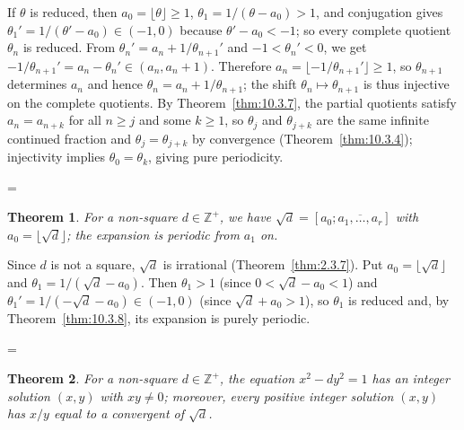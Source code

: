 \documentclass[11pt]{article}
\makeatletter
\theoremstyle{ntstyle}
\newtheorem{theorem}{Theorem}[subsection]
\let\nt@closedisplay\]
\def\nt@guardedclose{\@ifnextchar\par{\nt@closeafterpar}{\@ifnextchar\end{\postdisplaypenalty\@M\nt@closedisplay}{\nt@closedisplay}}}
\def\nt@closeafterpar\par{\@ifnextchar\par{\nt@closeafterpar}{\@ifnextchar\end{\postdisplaypenalty\@M\nt@closedisplay\par}{\nt@closedisplay\par}}}
\renewenvironment{proof}[1][\proofname]{\par
  \pushQED{\qed}\normalfont\topsep\medskipamount\edef\nt@afterproof{\@endparpenalty=\the\@endparpenalty\relax}\@beginparpenalty\@M\@endparpenalty\@M\let\]\nt@guardedclose\trivlist\item[]\textit{#1\@addpunct{.}} \ignorespaces}{\ifvmode\addpenalty\@M\fi\popQED\nt@afterproof\endtrivlist\@endpefalse}
\makeatother
\begin{document}
\begin{proof} If $\theta$ is reduced, then
	$a_0=\lfloor\theta\rfloor\ge1$, $\theta_1=1/(\theta-a_0)>1$, and
	conjugation gives $\theta_1'=1/(\theta'-a_0)\in(-1,0)$ because
	$\theta'-a_0<-1$; so every complete quotient $\theta_n$ is reduced.
	From $\theta_n'=a_n+1/\theta_{n+1}'$ and $-1<\theta_n'<0$,
	we get $-1/\theta_{n+1}'=a_n-\theta_n'\in(a_n,a_n+1)$.
	Therefore $a_n=\lfloor-1/\theta_{n+1}'\rfloor\ge1$, so
	$\theta_{n+1}$ determines $a_n$ and hence
	$\theta_n=a_n+1/\theta_{n+1}$; the shift
	$\theta_n\mapsto\theta_{n+1}$ is thus injective on the complete
	quotients. By Theorem~\ref{thm:10.3.7}, the partial quotients satisfy
	$a_n=a_{n+k}$ for all $n\ge j$ and some $k\ge1$, so $\theta_j$ and
	$\theta_{j+k}$ are the same infinite continued fraction and
	$\theta_j=\theta_{j+k}$ by convergence (Theorem~\ref{thm:10.3.4});
	injectivity implies $\theta_0=\theta_k$, giving pure
	periodicity.

\end{proof}
\begin{theorem}\label{thm:10.3.9} For a
	non-square $d\in\mathbb{Z}^+$, we have $\sqrt
		{d}=[a_0;\overline{a_1,\ldots,a_r}]$ with $a_0=\lfloor\sqrt{d}\rfloor$;
	the expansion is periodic from $a_1$ on.

\end{theorem}

\begin{proof} Since $d$ is not a square, $\sqrt{d}$ is irrational
	(Theorem~\ref{thm:2.3.7}). Put $a_0=\lfloor\sqrt{d}\rfloor$ and
	$\theta_1=1/(\sqrt{d}-a_0)$. Then $\theta_1>1$ (since $0<\sqrt
		{d}-a_0<1$) and $\theta_1'=1/(-\sqrt{d}-a_0)\in(-1,0)$ (since $\sqrt
		{d}+a_0>1$), so $\theta_1$ is reduced and, by Theorem~\ref{thm:10.3.8}, its expansion is purely
	periodic.

\end{proof}
\begin{theorem}\label{thm:10.3.10}
	For a non-square $d\in\mathbb{Z}^+$, the equation $x^2-dy^2=1$ has an integer solution
	$(x,y)$ with $xy\neq0$; moreover, every positive integer solution $(x,y)$ has $x/y$ equal
	to a convergent of $\sqrt{d}$.

\end{theorem}
\end{document}
